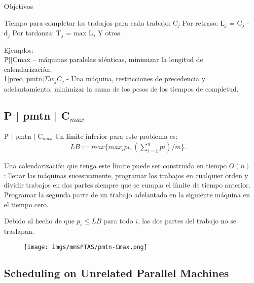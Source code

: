 \begin{frame}{\subsectiontitle}
    Objetivos
    \begin{itemize}
        \itemj Tiempo para completar los trabajos para cada trabajo: C$_j$
        \itemj Por retraso: L$_j$ = C$_j$ - d$_j$
        \itemj Por tardanza: T$_j$ = max L$_j$
        \itemj Y otros.
    \end{itemize}

    Ejemplos:\\
    P$||$Cmax – máquinas paralelas idénticas, minimizar la longitud de calendarización.\\
    1$|$prec, pmtn$| \Sigma w_jC_j$ - Una máquina, restricciones de precedencia y adelantamiento, minimizar la suma de los pesos de los tiempos de completud.
\end{frame}

\renewcommand{\subsectiontitle}{P $|$ pmtn $|$ C$_{max}$}
\subsection{\subsectiontitle}

\begin{frame}{\subsectiontitle}
Un límite inferior para este problema es:
\begin{align*}
    LB := max\{max_i pi,(\sum ^n_{i=1} pi)/m\}.
\end{align*}

Una calendarización que tenga este límite puede ser construida en tiempo $O(n)$ : llenar
las máquinas sucesivamente, programar los trabajos en cualquier orden y dividir
trabajos en dos partes siempre que se cumpla el límite de tiempo anterior. Programar la segunda parte de un trabajo adelantado en la siguiente máquina en el tiempo cero.

Debido al hecho de que $p_i \leq LB$ para todo $i$, las dos partes del trabajo no se traslapan.
\end{frame}

\begin{frame}
    \begin{figure}
        \texttt{[image: imgs/mmsPTAS/pmtn-Cmax.png]}
    \end{figure}
\end{frame}

\renewcommand{\subsectiontitle}{Scheduling on Unrelated Parallel Machines }
\subsection{\subsectiontitle}

